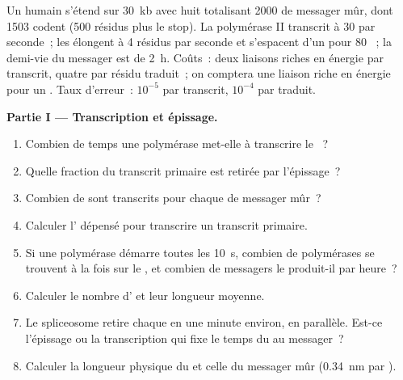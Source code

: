 \begin{problem}
\label{pb:b1:gene-expression:1}
Un  humain s'étend sur \qty{30}{kb} avec huit  totalisant
\qty{2000}{}  de messager mûr, dont \qty{1503}{} codent (500
résidus plus le stop). La polymérase II transcrit à \qty{30}{}
 par seconde~; les  élongent à \qty{4}{} résidus par
seconde et s'espacent d'un pour \qty{80}{} ~; la demi-vie du
messager est de \qty{2}{h}. Coûts~: deux liaisons riches en énergie par
 transcrit, quatre par résidu traduit~; on comptera une
liaison riche en énergie pour un . Taux d'erreur~: $10^{-5}$ par
 transcrit, $10^{-4}$ par  traduit.

\medskip
\noindent\textbf{Partie I --- Transcription et épissage.}
\begin{enumerate}
  \item Combien de temps une polymérase met-elle à transcrire le ~?
  \item Quelle fraction du transcrit primaire est retirée par
        l'épissage~?
  \item Combien de  sont transcrits pour chaque  de
        messager mûr~?
  \item Calculer l' dépensé pour transcrire un transcrit primaire.
  \item Si une polymérase démarre toutes les \qty{10}{s}, combien de
        polymérases se trouvent à la fois sur le , et combien de
        messagers le  produit-il par heure~?
  \item Calculer le nombre d' et leur longueur moyenne.
  \item Le spliceosome retire chaque  en une minute environ, en
        parallèle. Est-ce l'épissage ou la transcription qui fixe le
        temps du  au messager~?
  \item Calculer la longueur physique du  et celle du messager mûr
        (\qty{0.34}{nm} par ).
\end{enumerate}


\end{problem}
